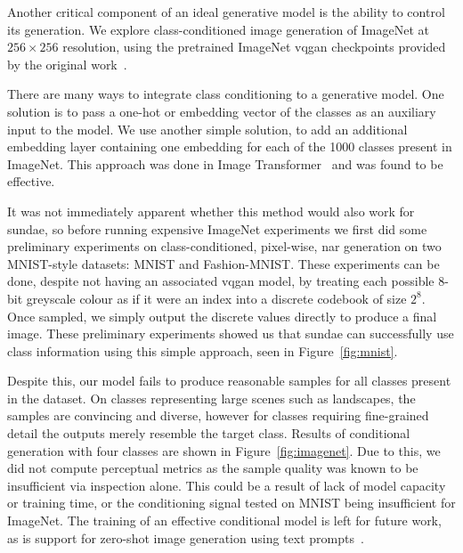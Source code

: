 Another critical component of an ideal generative model is the ability to
control its generation. We explore class-conditioned image generation of
ImageNet at $256 \times 256$ resolution, using the pretrained ImageNet
\gls{vqgan} checkpoints provided by the original work~\cite{esser2021taming}. 

There are many ways to integrate class conditioning to a generative model. One
solution is to pass a one-hot or embedding vector of the classes as an auxiliary
input to the model. We use another simple solution, to add an additional
embedding layer containing one embedding for each of the 1000 classes present in
ImageNet. This approach was done in Image Transformer~\cite{parmar2018image} and
was found to be effective. 

It was not immediately apparent whether this method would also work for
\gls{sundae}, so before running expensive ImageNet experiments we first did some
preliminary experiments on class-conditioned, pixel-wise, \gls{nar} generation
on two MNIST-style datasets: MNIST and Fashion-MNIST. These experiments can be
done, despite not having an associated \gls{vqgan} model, by treating each
possible 8-bit greyscale colour as if it were an index into a discrete codebook
of size $2^8$. Once sampled, we simply output the discrete values directly to
produce a final image. These preliminary experiments showed us that \gls{sundae}
can successfully use class information using this simple approach, seen in
Figure~\ref{fig:mnist}.

Despite this, our model fails to produce reasonable samples for all classes
present in the dataset. On classes representing large scenes such as landscapes,
the samples are convincing and diverse, however for classes requiring
fine-grained detail the outputs merely resemble the target class. Results of
conditional generation with four classes are shown in Figure~\ref{fig:imagenet}.
Due to this, we did not compute perceptual metrics as the sample quality was
known to be insufficient via inspection alone. This could be a result of lack of
model capacity or training time, or the conditioning signal tested on MNIST
being insufficient for ImageNet. The training of an effective conditional model
is left for future work, as is support for zero-shot image generation using text
prompts~\cite{ramesh2021dalle}.

